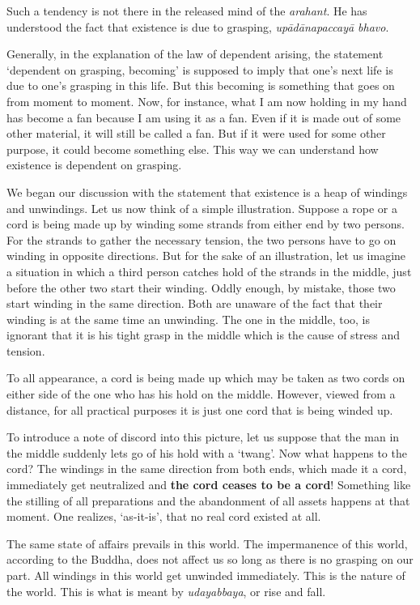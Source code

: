 Such a tendency is not there in the released mind of the \emph{arahant}. He has understood the fact that existence is due to grasping, \emph{upādānapaccayā bhavo}.

Generally, in the explanation of the law of dependent arising, the statement `dependent on grasping, becoming' is supposed to imply that one's next life is due to one's grasping in this life. But this becoming is something that goes on from moment to moment. Now, for instance, what I am now holding in my hand has become a fan because I am using it as a fan. Even if it is made out of some other material, it will still be called a fan. But if it were used for some other purpose, it could become something else. This way we can understand how existence is dependent on grasping.

We began our discussion with the statement that existence is a heap of windings and unwindings. Let us now think of a simple illustration. Suppose a rope or a cord is being made up by winding some strands from either end by two persons. For the strands to gather the necessary tension, the two persons have to go on winding in opposite directions. But for the sake of an illustration, let us imagine a situation in which a third person catches hold of the strands in the middle, just before the other two start their winding. Oddly enough, by mistake, those two start winding in the same direction. Both are unaware of the fact that their winding is at the same time an unwinding. The one in the middle, too, is ignorant that it is his tight grasp in the middle which is the cause of stress and tension.

To all appearance, a cord is being made up which may be taken as two cords on either side of the one who has his hold on the middle. However, viewed from a distance, for all practical purposes it is just one cord that is being winded up.

To introduce a note of discord into this picture, let us suppose that the man in the middle suddenly lets go of his hold with a `twang'. Now what happens to the cord? The windings in the same direction from both ends, which made it a cord, immediately get neutralized and \textbf{the cord ceases to be a cord}! Something like the stilling of all preparations and the abandonment of all assets happens at that moment. One realizes, `as-it-is', that no real cord existed at all.

The same state of affairs prevails in this world. The impermanence of this world, according to the Buddha, does not affect us so long as there is no grasping on our part. All windings in this world get unwinded immediately. This is the nature of the world. This is what is meant by \emph{udayabbaya}, or rise and fall.

